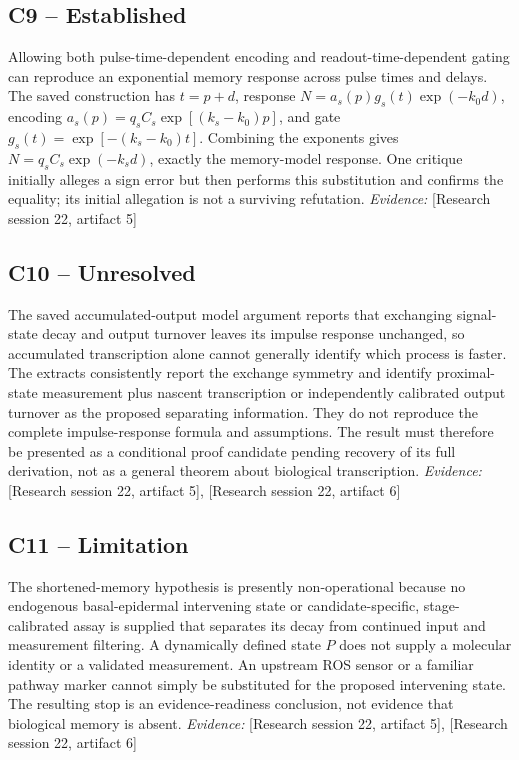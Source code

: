 \documentclass[11pt]{article}
\begin{document}
\begin{sloppypar}
\subsection{C9 -- Established}
Allowing both pulse-time-dependent encoding and readout-time-dependent gating can reproduce an exponential memory response across pulse times and delays.
The saved construction has $t=p+d$, response $N=a_s(p)g_s(t)\exp(-k_0d)$, encoding $a_s(p)=q_sC_s\exp[(k_s-k_0)p]$, and gate $g_s(t)=\exp[-(k_s-k_0)t]$. Combining the exponents gives $N=q_sC_s\exp(-k_sd)$, exactly the memory-model response. One critique initially alleges a sign error but then performs this substitution and confirms the equality; its initial allegation is not a surviving refutation.
\textit{Evidence: }[Research session 22, artifact 5]
\subsection{C10 -- Unresolved}
The saved accumulated-output model argument reports that exchanging signal-state decay and output turnover leaves its impulse response unchanged, so accumulated transcription alone cannot generally identify which process is faster.
The extracts consistently report the exchange symmetry and identify proximal-state measurement plus nascent transcription or independently calibrated output turnover as the proposed separating information. They do not reproduce the complete impulse-response formula and assumptions. The result must therefore be presented as a conditional proof candidate pending recovery of its full derivation, not as a general theorem about biological transcription.
\textit{Evidence: }[Research session 22, artifact 5], [Research session 22, artifact 6]
\subsection{C11 -- Limitation}
The shortened-memory hypothesis is presently non-operational because no endogenous basal-epidermal intervening state or candidate-specific, stage-calibrated assay is supplied that separates its decay from continued input and measurement filtering.
A dynamically defined state $P$ does not supply a molecular identity or a validated measurement. An upstream ROS sensor or a familiar pathway marker cannot simply be substituted for the proposed intervening state. The resulting stop is an evidence-readiness conclusion, not evidence that biological memory is absent.
\textit{Evidence: }[Research session 22, artifact 5], [Research session 22, artifact 6]

\end{sloppypar}
\end{document}
